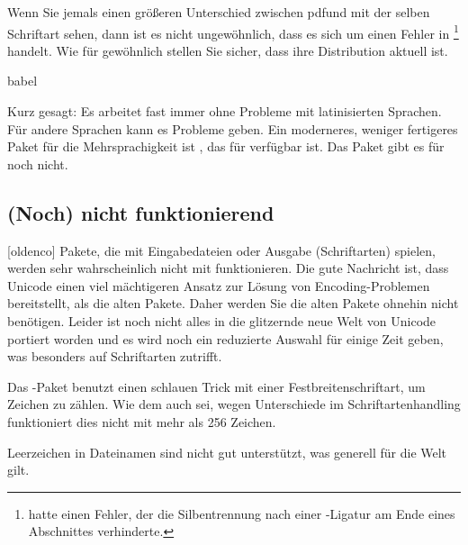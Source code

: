 \documentclass{lltxdoc}
\begin{document}
Wenn Sie jemals einen größeren Unterschied zwischen pdf\latex und \lualatex mit
der selben Schriftart sehen, dann ist es nicht ungewöhnlich, dass es sich um einen
Fehler in \lualatex\footnote{ hatte einen Fehler, der die 
Silbentrennung nach einer \code{-{}-{}-}-Ligatur am Ende eines Abschnittes
verhinderte.} handelt. Wie für gewöhnlich stellen Sie sicher, dass ihre 
Distribution aktuell ist.

\par{babel}

Kurz gesagt: Es arbeitet fast immer ohne Probleme mit latinisierten Sprachen. 
Für andere Sprachen kann es Probleme geben. Ein moderneres, weniger fertigeres
Paket für die Mehrsprachigkeit ist , das für \xelatex verfügbar
ist. Das Paket gibt es für \lualatex noch nicht.

\subsection{(Noch) nicht funktionierend}\label{notworking}

[oldenco] Pakete, die mit Eingabedateien oder Ausgabe
(Schriftarten) spielen, werden sehr wahrscheinlich nicht mit \lualatex 
funktionieren. Die gute Nachricht ist, dass Unicode einen viel mächtigeren
Ansatz zur Lösung von Encoding-Problemen bereitstellt, als die alten Pakete.
Daher werden Sie die alten Pakete ohnehin nicht benötigen. Leider ist noch nicht
alles in die glitzernde neue Welt von Unicode portiert worden und es wird
noch ein reduzierte Auswahl für einige Zeit geben, was besonders auf 
Schriftarten zutrifft.

 Das -Paket benutzt einen schlauen Trick mit einer
Festbreitenschriftart, um Zeichen zu zählen. Wie dem auch sei, wegen Unterschiede
im Schriftartenhandling funktioniert dies nicht mit mehr als 256 Zeichen. 

 Leerzeichen in Dateinamen sind nicht gut unterstützt, was 
generell für die \tex Welt gilt. 
\end{document}
